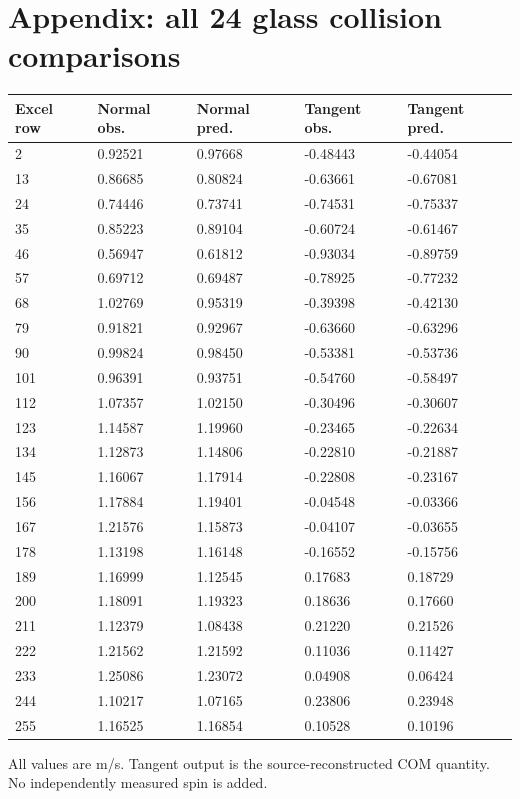\documentclass[10pt,a4paper]{article}
\begin{document}
\newpage
\section*{Appendix: all 24 glass collision comparisons}
\begin{center}\footnotesize\setlength{\tabcolsep}{4pt}
\begin{tabular}{lllll}
\hline
Excel row & Normal obs. & Normal pred. & Tangent obs. & Tangent pred.\\\hline
2 & 0.92521 & 0.97668 & -0.48443 & -0.44054\\
13 & 0.86685 & 0.80824 & -0.63661 & -0.67081\\
24 & 0.74446 & 0.73741 & -0.74531 & -0.75337\\
35 & 0.85223 & 0.89104 & -0.60724 & -0.61467\\
46 & 0.56947 & 0.61812 & -0.93034 & -0.89759\\
57 & 0.69712 & 0.69487 & -0.78925 & -0.77232\\
68 & 1.02769 & 0.95319 & -0.39398 & -0.42130\\
79 & 0.91821 & 0.92967 & -0.63660 & -0.63296\\
90 & 0.99824 & 0.98450 & -0.53381 & -0.53736\\
101 & 0.96391 & 0.93751 & -0.54760 & -0.58497\\
112 & 1.07357 & 1.02150 & -0.30496 & -0.30607\\
123 & 1.14587 & 1.19960 & -0.23465 & -0.22634\\
134 & 1.12873 & 1.14806 & -0.22810 & -0.21887\\
145 & 1.16067 & 1.17914 & -0.22808 & -0.23167\\
156 & 1.17884 & 1.19401 & -0.04548 & -0.03366\\
167 & 1.21576 & 1.15873 & -0.04107 & -0.03655\\
178 & 1.13198 & 1.16148 & -0.16552 & -0.15756\\
189 & 1.16999 & 1.12545 & 0.17683 & 0.18729\\
200 & 1.18091 & 1.19323 & 0.18636 & 0.17660\\
211 & 1.12379 & 1.08438 & 0.21220 & 0.21526\\
222 & 1.21562 & 1.21592 & 0.11036 & 0.11427\\
233 & 1.25086 & 1.23072 & 0.04908 & 0.06424\\
244 & 1.10217 & 1.07165 & 0.23806 & 0.23948\\
255 & 1.16525 & 1.16854 & 0.10528 & 0.10196\\
\hline\end{tabular}\end{center}All values are m/s. Tangent output is the source-reconstructed COM quantity. No independently measured spin is added.
\newpage
\end{document}
